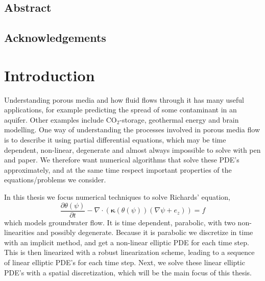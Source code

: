 \documentclass[../Main/main.tex]{subfiles}
\begin{document}
\section*{Abstract}
\markboth{}{}

\section*{Acknowledgements}

\chapter{Introduction}
Understanding porous media and how fluid flows through it has many useful applications, for example predicting the spread of some contaminant in an aquifer. Other examples include $\text{CO}_2$-storage, geothermal energy and brain modelling. One way of understanding the processes involved in porous media flow is to describe it using partial differential equations, which may be time dependent, non-linear, degenerate and almost always impossible to solve with pen and paper. We therefore want numerical algorithms that solve these PDE's approximately, and at the same time respect important properties of the equations/problems we consider.\par
In this thesis we focus numerical techniques to solve Richards' equation, 
\begin{equation}\label{eq:rihcards_I}
	\frac{\partial \theta(\psi)}{\partial t} - \nabla \cdot (\bm{\kappa} (\theta (\psi))(\nabla \psi + e_z)) = f
\end{equation}
which models groundwater flow. 
It is time dependent, parabolic, with two non-linearities and possibly degenerate. Because it is parabolic we discretize in time with an implicit method, and get a non-linear elliptic PDE for each time step. This is then linearized with a robust linearization scheme, leading to a sequence of linear elliptic PDE's for each time step. Next, we solve these linear elliptic PDE's with a spatial discretization, which will be the main focus of this thesis.
\end{document}
